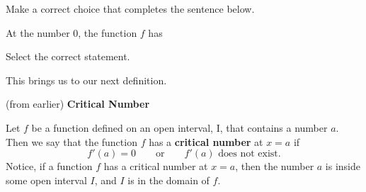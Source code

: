\documentclass{ximera}
\begin{document}
\begin{question}

 Make a correct choice that completes the sentence below. 
 
  At the number $0$, the function $f$ has 

  \begin{multipleChoice}
  \end{multipleChoice}
  \end{question}
  \begin{question}
Select the correct statement.
  \begin{multipleChoice}
  \end{multipleChoice}
\end{question}

This brings us to our next definition.










\begin{definition} (from earlier) \textbf{\textcolor{green!50!black}{Critical Number}}


  Let $f$ be a function defined on an open interval, I, that contains a number $a$. Then we say that the function $f$ has a \textbf{critical number} at $x=a$ if 
  \[
  f'(a) = 0\qquad\text{or}\qquad \text{$f'(a)$ does not exist.}
  \]
 Notice, if a function $f$ has a critical number at $x=a$, then the number $a$ is inside some open interval $I$, and $I$ is in the domain of $f$. 
 
\end{definition}
\end{document}
